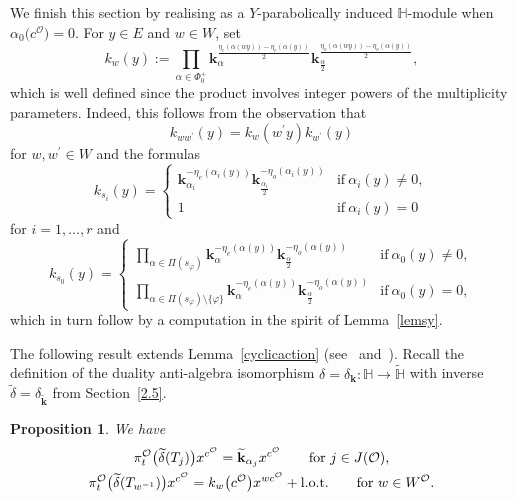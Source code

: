 \documentclass[pdftex]{sigma}
\numberwithin{equation}{section}
\newtheorem{Proposition}[Theorem]{Proposition}
\begin{document}
We finish this section by realising  as a $Y$-parabolically induced $\mathbb{H}$-module when $\alpha_0\bigl(c^\mathcal{O}\bigr)=0$.
For $y\in E$ and $w\in W$, set
\[
k_w(y):=\prod_{\alpha\in\Phi_0^+}\mathbf{k}_\alpha^{\frac{\eta_e(\alpha(wy))-\eta_e(\alpha(y))}{2}}
\mathbf{k}_{\frac{\alpha}{2}}^{\frac{\eta_o(\alpha(wy))-\eta_o(\alpha(y))}{2}},
\]
which is well defined since the product involves integer powers of the multiplicity parameters. Indeed, this follows from the observation that
\begin{equation}\label{kcocycle}
k_{ww^\prime}(y)=k_w(w^\prime y)k_{w^\prime}(y)
\end{equation}
for $w,w^\prime\in W$ and the formulas
\begin{equation}\label{kcocycle1}
k_{s_i}(y)=
\begin{cases}
\mathbf{k}_{\alpha_i}^{-\eta_e(\alpha_i(y))}\mathbf{k}_{\frac{\alpha_i}{2}}^{-\eta_o(\alpha_i(y))} &\text{if}\ \alpha_i(y)\not=0,\\
1 &\text{if}\ \alpha_i(y)=0
\end{cases}
\end{equation}
for $i=1,\dots,r$ and
\begin{equation}\label{kcocycle2}
k_{s_0}(y)=
\begin{cases}
\prod_{\alpha\in\Pi(s_\varphi)}\mathbf{k}_{\alpha}^{-\eta_e(\alpha(y))}\mathbf{k}_{\frac{\alpha}{2}}^{-\eta_o(\alpha(y))} &\text{if}\ \alpha_0(y)\not=0,\\[1.1mm]
\prod_{\alpha\in\Pi(s_\varphi)\setminus\{\varphi\}}\mathbf{k}_{\alpha}^{-\eta_e(\alpha(y))}\mathbf{k}_{\frac{\alpha}{2}}^{-\eta_o(\alpha(y))} &\text{if}\ \alpha_0(y)=0,
\end{cases}
\end{equation}
which in turn follow by a computation in the spirit of Lemma~\ref{lemsy}.

The following result extends Lemma~\ref{cyclicaction} (see~\cite[Lemma~5.11]{SSV2} and~\cite[Proposition~5.29]{SSV2}). Recall the definition of the duality anti-algebra isomorphism
$\delta=\delta_{\mathbf{k}}\colon \mathbb{H}\rightarrow\widetilde{\mathbb{H}}$ with inverse $\widetilde{\delta}=\delta_{\widetilde{\mathbf{k}}}$ from Section~\ref{2.5}.

\begin{Proposition}\label{triangdelta}
We have
\begin{gather}
\pi_{t}^\mathcal{O}\bigl(\widetilde{\delta}(T_j)\bigr)x^{c^\mathcal{O}}=\widetilde{\mathbf{k}}_{\alpha_j}x^{c^\mathcal{O}} \qquad \textup{for}\ j\in J(\mathcal{O}),\nonumber\\
\pi_{t}^\mathcal{O}\bigl(\widetilde{\delta}(T_{w^{-1}})\bigr)x^{c^\mathcal{O}}=k_w\bigl(c^\mathcal{O}\bigr)x^{wc^\mathcal{O}}+ {\rm l.o.t.}\qquad \textup{for}\ w\in W^\mathcal{O}.
\label{genfor}
\end{gather}
\end{Proposition}
\end{document}
